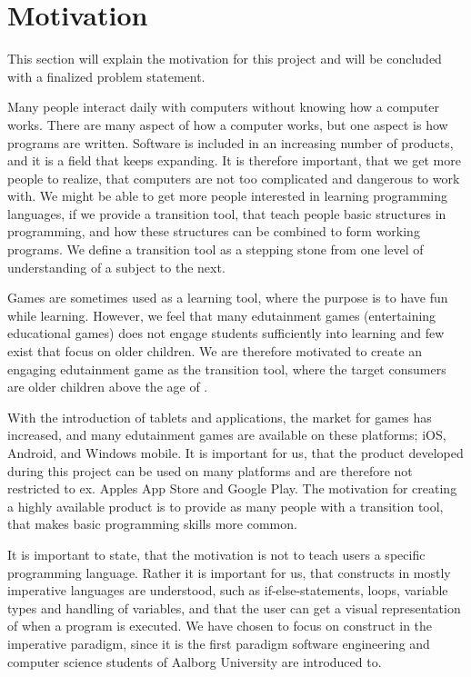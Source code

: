 \section{Motivation}
\label{sec:motivation}

This section will explain the motivation for this project and will be concluded with a finalized problem statement.\newline

Many people interact daily with computers without knowing how a computer works. There are many aspect of how a computer works, but one aspect is how programs are written.
Software is included in an increasing number of products, and it is a field that keeps expanding.
It is therefore important, that we get more people to realize, that computers are not too complicated and dangerous to work with.
We might be able to get more people interested in learning programming languages, if we provide a transition tool, that teach people basic structures in programming, and how these structures can be combined to form working programs. We define a transition tool as a stepping stone from one level of understanding of a subject to the next.\newline

Games are sometimes used as a learning tool, where the purpose is to have fun while learning.
However, we feel that many edutainment games (entertaining educational games) does not engage students sufficiently into learning and few exist that focus on older children. 
We are therefore motivated to create an engaging edutainment game as the transition tool, where the target consumers are older children above the age of .\newline

With the introduction of tablets and applications, the market for games has increased, and many edutainment games are available on these platforms; iOS, Android, and Windows mobile.
It is important for us, that the product developed during this project can be used on many platforms and are therefore not restricted to ex. Apples App Store and Google Play.
The motivation for creating a highly available product is to provide as many people with a transition tool, that makes basic programming skills more common.\newline

It is important to state, that the motivation is not to teach users a specific programming language.
Rather it is important for us, that constructs in mostly imperative languages are understood, such as if-else-statements, loops, variable types and handling of variables, and that the user can get a visual representation of when a program is executed. We have chosen to focus on construct in the imperative paradigm, since it is the first paradigm software engineering and computer science students of Aalborg University are introduced to.\newline

